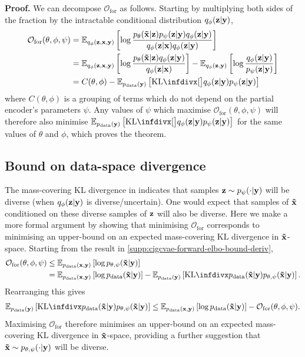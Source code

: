 \textbf{Proof.} We can decompose $\mathcal{O}_\mathrm{for}$ as follows.
Starting by multiplying both sides of the fraction by the intractable
conditional distribution $q_\phi({\mathbf{z}}|{\mathbf{y}})$,
\begin{align}
  \mathcal{O}_\mathrm{for}(\theta, \phi, \psi ) &= \EX_{q_\phi(\rvz,\rvx,\rvy)} \left[ \log \frac{p_\theta(\tildeI{}|\rvz)p_\psi(\rvz|\rvy)q_\phi(\rvz|\rvy)}{q_\phi(\rvz|\rvx)q_\phi(\rvz|\rvy)} \right]\\
                                                   &= \EX_{q_\phi(\rvz,\rvx,\rvy)} \left[ \log \frac{p_\theta(\tildeI{}|\rvz)q_\phi(\rvz|\rvy)}{q_\phi(\rvz|\rvx)} \right] - \EX_{q_\phi(\rvz,\rvy)} \left[ \log\frac{q_\phi(\rvz|\rvy)}{p_\psi(\rvz|\rvy)} \right] \\
                                                   &= C(\theta, \phi) - \EX_{\pdata (\rvy)} \left[ \kl[\big]{ q_\phi(\rvz|\rvy) }{ p_\psi(\rvz|\rvy) } \right]   \label{eq:constant-and-forward-kl}
\end{align}
where $C(\theta, \phi)$ is a grouping of terms which do not depend on the
partial encoder's parameters $\psi $. Any values of $\psi$ which
maximise $\mathcal{O}_\mathrm{for}(\theta, \phi, \psi)$ will therefore also
minimise $\EX_{\pdata (\rvy)} \left[ \kl[\big]{ q_\phi(\rvz|\rvy) }{p_\psi(\rvz|\rvy) } \right]$ for the same values of $\theta$ and $\phi$,
which proves the theorem.

\subsection{Bound on data-space divergence}
The mass-covering KL divergence in  indicates that
samples ${\mathbf{z}}\sim p_\psi(\cdot|{\mathbf{y}})$ will be diverse (when $q_\phi({\mathbf{z}}|{\mathbf{y}})$ is
diverse/uncertain). One would expect that samples of $\mathbf{\tilde{x}}{}$ conditioned on these
diverse samples of ${\mathbf{z}}$ will also be diverse. Here we make a more formal argument
by showing that minimising $\mathcal{O}_\mathrm{for}$ corresponds to minimising
an upper-bound on an expected mass-covering KL divergence in $\mathbf{\tilde{x}}{}$-space.
Starting from the result in \cref{supp:cigcvae-forward-elbo-bound-deriv},
\begin{align}
  \mathcal{O}_\mathrm{for}(\theta, \phi, \psi ) &\leq \EX_{\pdata (\rvx,\rvy)} \left[ \log p_{\theta,\psi}(\tildeI{}|\rvy) \right] \\
                                                     &= \EX_{\pdata (\rvx,\rvy)} \left[ \log \pdata (\tildeI{}|\rvy) \right] - \EX_{\pdata (\rvy)}\left[ \kl{\pdata (\tildeI{}|\rvy)}{p_{\theta,\psi}(\tildeI{}|\rvy)} \right].
\end{align}
Rearranging this gives
\begin{align}
  \EX_{\pdata (\rvy)}\left[ \kl{\pdata (\tildeI{}|\rvy)}{p_{\theta,\psi}(\tildeI{}|\rvy)} \right]  \leq \EX_{\pdata (\rvx,\rvy)} \left[ \log \pdata (\tildeI{}|\rvy) \right] - \mathcal{O}_\mathrm{for}(\theta, \phi, \psi ).
\end{align}
Maximising $\mathcal{O}_\mathrm{for}$ therefore minimises an upper-bound on an
expected mass-covering KL divergence in $\mathbf{\tilde{x}}{}$-space, providing a further suggestion that
$\mathbf{\tilde{x}}{}\sim p_{\theta,\psi}(\cdot|{\mathbf{y}})$ will be diverse.

